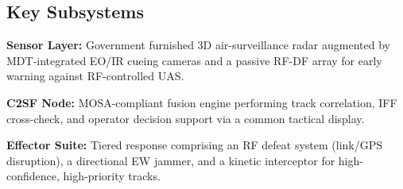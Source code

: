 \subsection{Key Subsystems}
\begin{reqlist}
\item \textbf{Sensor Layer:} Government furnished 3D air-surveillance radar augmented by MDT-integrated EO/IR cueing cameras and a passive RF-DF array for early warning against RF-controlled UAS.
\item \textbf{C2SF Node:} MOSA-compliant fusion engine performing track correlation, IFF cross-check, and operator decision support via a common tactical display.
\item \textbf{Effector Suite:} Tiered response comprising an RF defeat system (link/GPS disruption), a directional EW jammer, and a kinetic interceptor for high-confidence, high-priority tracks.
\end{reqlist}

\clearpage

